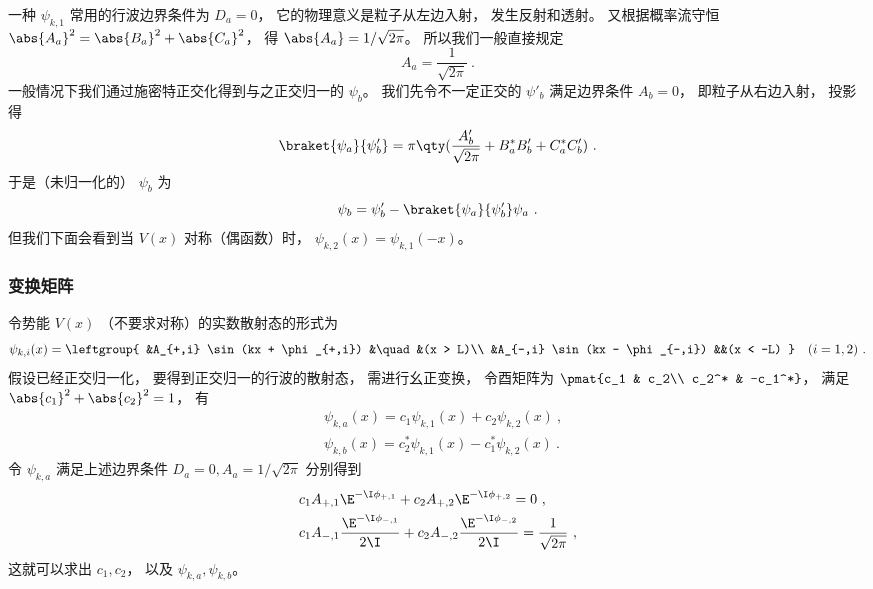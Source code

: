 一种 $\psi_{k,1}$ 常用的行波边界条件为 $D_a = 0$， 它的物理意义是粒子从左边入射， 发生反射和透射。 又根据概率流守恒 $\abs{A_a}^2 = \abs{B_a}^2 + \abs{C_a}^2$， 得 $\abs{A_a} = 1/\sqrt{2\pi}$。 所以我们一般直接规定
\begin{equation}\label{eq_ScaNrm_10}
A_a = \frac{1}{\sqrt{2\pi}}~.
\end{equation}
一般情况下我们通过施密特正交化得到与之正交归一的 $\psi_b$。 我们先令不一定正交的 $\psi'_b$ 满足边界条件 $A_b = 0$， 即粒子从右边入射， 投影得
\begin{equation}
\braket{\psi_a}{\psi'_b} = \pi \qty(\frac{A'_b}{\sqrt{2\pi}} + B_a^* B'_b + C_a^*C'_b)~.
\end{equation}
于是（未归一化的） $\psi_b$ 为
\begin{equation}
\psi_b = \psi'_b - \braket{\psi_a}{\psi'_b}\psi_a~.
\end{equation}
但我们下面会看到当 $V(x)$ 对称（偶函数）时， $\psi_{k,2}(x) = \psi_{k,1}(-x)$。

\subsubsection{变换矩阵}
令势能 $V(x)$ （不要求对称）的实数散射态的形式为
\begin{equation}
\psi_{k,i}(x) = \leftgroup{
    &A_{+,i} \sin(kx + \phi_{+,i}) &\quad &(x > L)\\
    &A_{-,i} \sin(kx - \phi_{-,i}) &&(x < -L)
} \quad (i = 1,2)~.
\end{equation}
假设已经正交归一化， 要得到正交归一的行波的散射态， 需进行幺正变换， 令酉矩阵为 $\pmat{c_1 & c_2\\ c_2^* & -c_1^*}$， 满足 $\abs{c_1}^2 + \abs{c_2}^2 = 1$， 有
\begin{equation}
\begin{aligned}
&\psi_{k,a}(x) = c_1\psi_{k,1}(x) + c_2\psi_{k,2}(x)~,\\
&\psi_{k,b}(x) = c_2^*\psi_{k,1}(x) - c_1^*\psi_{k,2}(x)~.
\end{aligned}
\end{equation}
令 $\psi_{k,a}$ 满足上述边界条件 $D_a = 0, A_a = 1/\sqrt{2\pi}$ 分别得到
\begin{equation}\label{eq_ScaNrm_12}
\begin{aligned}
&c_1 A_{+,1}\E^{-\I\phi_{+,1}} + c_2 A_{+,2}\E^{-\I\phi_{+,2}} = 0~,\\
&c_1 A_{-,1}\frac{\E^{-\I\phi_{-,1}}}{2\I} + c_2 A_{-,2}\frac{\E^{-\I\phi_{-,2}}}{2\I} = \frac{1}{\sqrt{2\pi}}~,
\end{aligned}
\end{equation}
这就可以求出 $c_1, c_2$， 以及 $\psi_{k,a}, \psi_{k,b}$。

